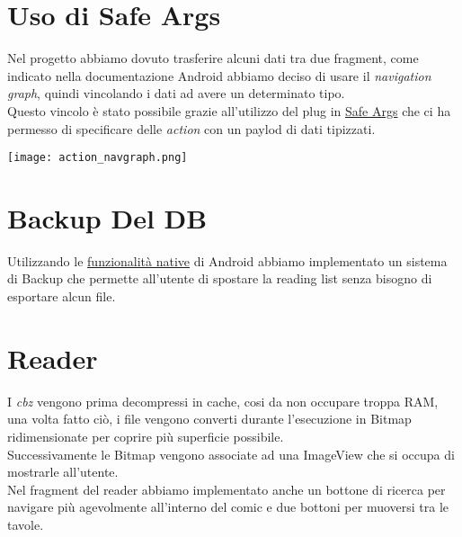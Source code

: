 \documentclass[../Assignment-3-LPSMT.tex]{subfiles}
\begin{document}
\section{Uso di Safe Args}

Nel progetto abbiamo dovuto trasferire alcuni dati tra due fragment, come indicato nella documentazione Android abbiamo deciso di usare il \emph{navigation graph}, quindi vincolando i dati ad avere un determinato tipo.\\
Questo vincolo è stato possibile grazie all'utilizzo del plug in \href{https://developer.android.com/guide/navigation/use-graph/pass-data#Safe-args}{Safe Args} che ci ha permesso di specificare delle \emph{action} con un paylod di dati tipizzati.\\

\begin{center}
  \texttt{[image: action\_navgraph.png]}
\end{center}

\section{Backup Del DB}

Utilizzando le \href{https://developer.android.com/guide/topics/data/autobackup}{funzionalità native} di Android abbiamo implementato un sistema di Backup che permette all'utente di spostare la reading list senza bisogno di esportare alcun file.\\

\section{Reader}

I \emph{cbz} vengono prima decompressi in cache, cosi da non occupare troppa RAM, una volta fatto ciò, i file vengono converti durante l'esecuzione in Bitmap ridimensionate per coprire più superficie possibile.\\
Successivamente le Bitmap vengono associate ad una ImageView che si occupa di mostrarle all'utente.\\
Nel fragment del reader abbiamo implementato anche un bottone di ricerca per navigare più agevolmente all'interno del comic e due bottoni per muoversi tra le tavole.
\end{document}
